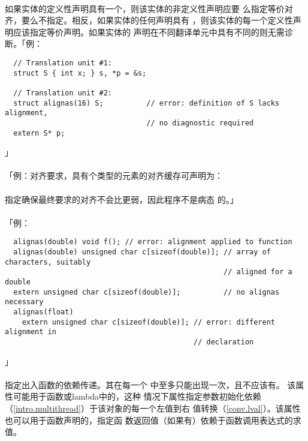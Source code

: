 \paragraph{}
如果实体的定义性声明具有一个，则该实体的非定义性声明应要
么指定等价对齐，要么不指定。相反，如果实体的任何声明具有
，则该实体的每一个定义性声明应该指定等价声明。如果实体的
声明在不同翻译单元中具有不同的则无需诊断。「例：
\begin{lstlisting}
  // Translation unit #1:
  struct S { int x; } s, *p = &s;

  // Translation unit #2:
  struct alignas(16) S;          // error: definition of S lacks alignment,
                                 // no diagnostic required
  extern S* p;
\end{lstlisting}」

\paragraph{}
「例：对齐要求，具有个类型的元素的对齐缓存可声明为：        \\
\mbox{\qquad {}}                         \\
指定确保最终要求的对齐不会比更弱，因此程序不是病态
的。」

\paragraph{}
「例：
\begin{lstlisting}
  alignas(double) void f(); // error: alignment applied to function
  alignas(double) unsigned char c[sizeof(double)]; // array of characters, suitably
                                                   // aligned for a double
  extern unsigned char c[sizeof(double)];          // no alignas necessary
  alignas(float)
    extern unsigned char c[sizeof(double)]; // error: different alignment in
                                            // declaration
\end{lstlisting}」

\paragraph{}
 指定出入函数的依赖传递。其在每一个
中至多只能出现一次，且不应该有。
该属性可能用于函数或lambda中的，这种
情况下属性指定参数初始化依赖（\ref{intro.multithread}）于该对象的每一个左值到右
值转换（\ref{conv.lval}）。该属性也可以用于函数声明的，指定函
数返回值（如果有）依赖于函数调用表达式的求值。

